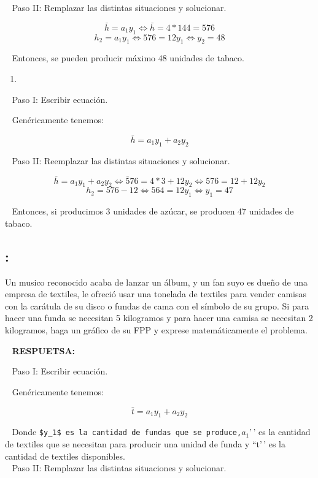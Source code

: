 \documentclass[
  letterpaper,
  DIV=11,
  numbers=noendperiod]{scrreport}
\providecommand{\tightlist}{%
  \setlength{\itemsep}{0pt}\setlength{\parskip}{0pt}}\usepackage{longtable,booktabs,array}
\begin{document}
~ Paso II: Remplazar las distintas situaciones y solucionar.

\[\bar h=a_1y_1 \Leftrightarrow \bar h=4*144=576\]
\[h_2=a_1y_1 \Leftrightarrow  576=12y_1  \Leftrightarrow y_2=48\]

~ Entonces, se pueden producir máximo 48 unidades de tabaco.\\

\begin{enumerate}
\def\labelenumi{\alph{enumi})}
\setcounter{enumi}{2}
\tightlist
\item
\end{enumerate}

~ Paso I: Escribir ecuación.

~ Genéricamente tenemos:

\[\bar h=a_1y_1+a_2y_2\]

~ Paso II: Reemplazar las distintas situaciones y solucionar.

\[\bar h=a_1y_1 + a_2y_2\Leftrightarrow \bar 576=4*3+12y_2 \Leftrightarrow 576=12+12y_2\]
\[h_2= 576- 12 \Leftrightarrow  564=12y_1  \Leftrightarrow y_1=47\]

~ Entonces, si producimos \(3\) unidades de azúcar, se producen 47
unidades de tabaco.

\hypertarget{section-6}{%
\subsection{:}\label{section-6}}

Un musico reconocido acaba de lanzar un álbum, y un fan suyo es dueño de
una empresa de textiles, le ofreció usar una tonelada de textiles para
vender camisas con la carátula de su disco o fundas de cama con el
símbolo de su grupo. Si para hacer una funda se necesitan 5 kilogramos y
para hacer una camisa se necesitan 2 kilogramos, haga un gráfico de su
FPP y exprese matemáticamente el problema.

~ \textbf{RESPUETSA:}

~ Paso I: Escribir ecuación.

~ Genéricamente tenemos:

\[\bar t=a_1y_1+a_2y_2\]

~ Donde
\texttt{\$y\_1\$\textquotesingle{}\textquotesingle{}\ es\ la\ cantidad\ de\ fundas\ que\ se\ produce,}\(a_1\)'\,'
es la cantidad de textiles que se necesitan para producir una unidad de
funda y ``t'\,' es la cantidad de textiles disponibles.\\

~ Paso II: Remplazar las distintas situaciones y solucionar.
\end{document}
